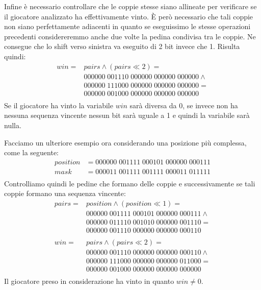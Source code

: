 \documentclass[a4paper]{article}
\begin{document}
Infine è necessario controllare che le coppie stesse siano allineate per 
verificare se il giocatore analizzato ha effettivamente vinto. È però necessario
che tali coppie non siano perfettamente adiacenti in quanto se eseguissimo le 
stesse operazioni precedenti considereremmo anche due volte la pedina condivisa 
tra le coppie. Ne consegue che lo shift verso sinistra va eseguito di 2 bit 
invece che 1. Risulta quindi:
\begin{align*}
  win = &pairs \land (pairs \ll 2) =\\
  &000000\; 001110\; 000000\; 000000\; 000000 \land \\
  &000000\; 111000\; 000000\; 000000\; 000000 = \\
  &000000\; 001000\; 000000\; 000000\; 000000\\
\end{align*}
Se il giocatore ha vinto la variabile $win$ sarà diversa da 0, se invece non ha
nessuna sequenza vincente nessun bit sarà uguale a 1 e quindi la variabile sarà
nulla.

Facciamo un ulteriore esempio ora considerando una posizione più complessa, come
la seguente:
\begin{align*}
  position &= 000000 \; 001111 \; 000101 \; 000000 \; 000111\\
  mask &= 000011 \; 001111 \; 001111 \; 000011 \; 011111\\
\end{align*}
Controlliamo quindi le pedine che formano delle coppie e successivamente se tali 
coppie formano una sequenza vincente:
\begin{align*}
  pairs = &position \land (position \ll 1) =\\
  &000000 \; 001111 \; 000101 \; 000000 \; 000111 \land \\
  &000000 \; 011110 \; 001010 \; 000000 \; 001110 = \\
  &000000 \; 001110 \; 000000 \; 000000 \; 000110\\
  \\
  win = &pairs \land (pairs \ll 2) =\\
  &000000 \; 001110 \; 000000 \; 000000 \; 000110 \land \\
  &000000 \; 111000 \; 000000 \; 000000 \; 011000 = \\
  &000000 \; 001000 \; 000000 \; 000000 \; 000000\\
\end{align*}
Il giocatore preso in considerazione ha vinto in quanto $win \neq 0$.\medskip
\end{document}
